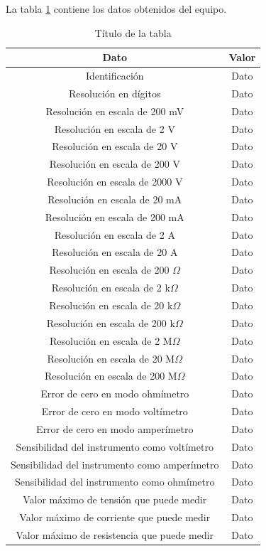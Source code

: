 \documentclass[letter]{article}
\begin{document}
La tabla \ref{tab:datos_equipos} contiene los datos obtenidos del equipo.

\begin{table}
    \centering
    \caption{Título de la tabla}
    \label{tab:datos_equipos}
    \begin{tabular}{|c|c|}
        \hline
        Dato & Valor\\
        \hline
        Identificación & Dato \\
        Resolución en dígitos & Dato \\
        Resolución en escala de 200 mV & Dato \\
        Resolución en escala de 2 V & Dato \\
        Resolución en escala de 20 V & Dato \\
        Resolución en escala de 200 V & Dato \\
        Resolución en escala de 2000 V & Dato \\
        Resolución en escala de 20 mA & Dato \\
        Resolución en escala de 200 mA & Dato \\
        Resolución en escala de 2 A & Dato \\
        Resolución en escala de 20 A & Dato \\
        Resolución en escala de 200 \(\Omega\) & Dato \\
        Resolución en escala de 2 k\(\Omega\) & Dato \\
        Resolución en escala de 20 k\(\Omega\) & Dato \\
        Resolución en escala de 200 k\(\Omega\) & Dato \\
        Resolución en escala de 2 M\(\Omega\) & Dato \\
        Resolución en escala de 20 M\(\Omega\) & Dato \\
        Resolución en escala de 200 M\(\Omega\) & Dato \\
        Error de cero en modo ohmímetro & Dato \\
        Error de cero en modo voltímetro & Dato \\
        Error de cero en modo amperímetro & Dato \\
        Sensibilidad del instrumento como voltímetro & Dato \\
        Sensibilidad del instrumento como amperímetro & Dato \\
        Sensibilidad del instrumento como ohmímetro & Dato \\
        Valor máximo de tensión que puede medir & Dato \\
        Valor máximo de corriente que puede medir & Dato \\
        Valor máximo de resistencia que puede medir & Dato \\
        \hline 
    \end{tabular} 
\end{table}
\end{document}
